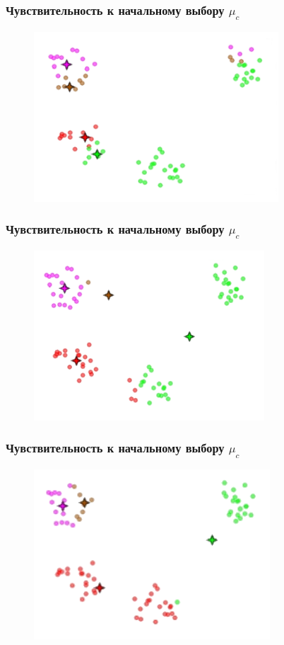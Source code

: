 \documentclass[12pt]{beamer}
\begin{document}
\begin{frame}\frametitle{Чувствительность к начальному выбору $\mu_c$}
\begin{figure}[htbp]
  \includegraphics[height=180pt, keepaspectratio = true]{images/local_min2}  
\end{figure}
\end{frame}

\begin{frame}\frametitle{Чувствительность к начальному выбору $\mu_c$}
\begin{figure}[htbp]
  \includegraphics[height=180pt, keepaspectratio = true]{images/local_min4}  
\end{figure}
\end{frame}

\begin{frame}\frametitle{Чувствительность к начальному выбору $\mu_c$}
\begin{figure}[htbp]
  \includegraphics[height=180pt, keepaspectratio = true]{images/local_min6}  
\end{figure}
\end{frame}
\end{document}
